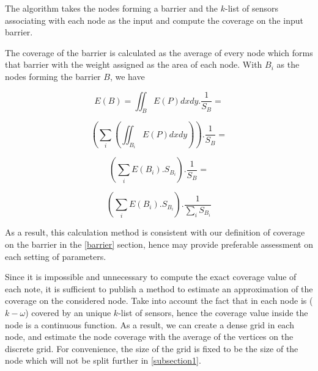 The algorithm takes the nodes forming a barrier and the $k$-list of sensors associating with each node as the input and compute the coverage on the input barrier.

The coverage of the barrier is calculated as the average of every node which forms that barrier with the weight assigned as the area of each node. With $B_i$ as the nodes forming the barrier $B$, we have

$$E(B) = \iint_{B}E(P)dxdy.\frac{1}{S_B} =$$

$$(\sum_i(\iint_{B_i}E(P)dxdy)).\frac{1}{S_B} =$$

$$(\sum_iE(B_i).S_{B_i}).\frac{1}{S_B} =$$

$$(\sum_iE(B_i).S_{B_i}).\frac{1}{\sum_iS_{B_i}}$$

As a result, this calculation method is consistent with our definition of coverage on the barrier in the \ref{barrier} section, hence may provide preferable assessment on each setting of parameters.

Since it is impossible and unnecessary to compute the exact coverage value of each note, it is sufficient to publish a method to estimate an approximation of the coverage on the considered node. Take into account the fact that in each node is ($k-\omega$) covered by an unique $k$-list of sensors, hence the coverage value inside the node is a continuous function. As a result, we can create a dense grid in each node, and estimate the node coverage with the average of the vertices on the discrete grid. For convenience, the size of the grid is fixed to be the size of the node which will not be split further in \ref{subsection1}.
